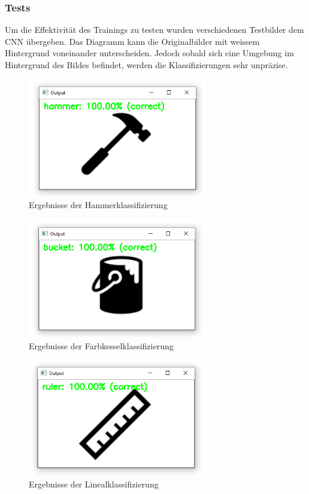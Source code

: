 \subsubsection{Tests}
Um die Effektivität des Trainings zu testen wurden verschiedenen Testbilder dem CNN übergeben. Das Diagramm kann die Originalbilder mit weissem Hintergrund voneinander unterscheiden. Jedoch sobald sich eine Umgebung im Hintergrund des Bildes befindet, werden die Klassifizierungen sehr unpräzise.

\begin{figure}[H]
  \includegraphics[width=0.7\textwidth]{img/piktogrammerkennung/classifiedHammer.png}
  \centering
  \caption{Ergebnisse der Hammerklassifizierung}
\end{figure}

\begin{figure}[H]
  \includegraphics[width=0.7\textwidth]{img/piktogrammerkennung/classifiedBucket.png}
  \centering
  \caption{Ergebnisse der Farbkesselklassifizierung}
\end{figure}

\begin{figure}[H]
  \includegraphics[width=0.7\textwidth]{img/piktogrammerkennung/classifiedRuler.png}
  \centering
  \caption{Ergebnisse der Linealklassifizierung}
\end{figure}
   
